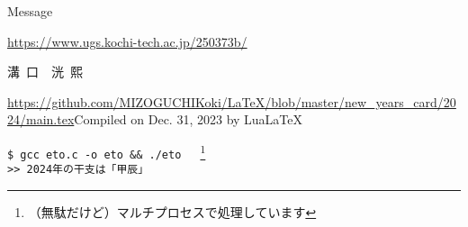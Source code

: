 \documentclass[twocolumn,fontsize=9pt]{jlreq}
\begin{document}
\begin{itembox}[l]{\small Message}
    \scriptsize

\end{itembox}
\begin{framed}
    {\noindent\scriptsize\url{https://www.ugs.kochi-tech.ac.jp/250373b/}}
    \vspace{.5cm}
    \begin{center}
        {\LARGE 溝\ 口\ \  洸\ 熙}
    \end{center}
\end{framed}
\noindent\tiny{\url{https://github.com/MIZOGUCHIKoki/LaTeX/blob/master/new_years_card/2024/main.tex}\hfill Compiled on Dec. 31, 2023 by Lua\LaTeX}
\newpage

\small{\texttt{\$ gcc eto.c -o eto \&\& ./eto }\ \ \footnote{（無駄だけど）マルチプロセスで処理しています}\\
    \texttt{>> 2024年の干支は「甲辰」}}
\end{document}
